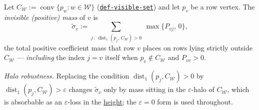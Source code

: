 \hypertarget{def:invisible-mass}{}%
\begin{definition}\label{def:invisible-mass}
Let $C_{\mathcal W}:=\operatorname{conv}\{p_w:w\in\mathcal W\}$ (\hyperref[def:visible-set]{\texttt{def-\allowbreak{}visible-\allowbreak{}set}}) and let
$p_v$ be a row vertex. The \emph{invisible (positive) mass} of $v$ is
\[\widetilde\sigma_v:=\sum_{j\,:\,\operatorname{dist}_1(p_j,\,C_{\mathcal W})>0}\ \max\{P_{vj},\,0\},\]
the total positive coefficient mass that row $v$ places on rows lying strictly outside $C_{\mathcal W}$ ---
\emph{including} the index $j=v$ itself when $p_v\notin C_{\mathcal W}$ and $P_{vv}>0$.

\emph{Halo robustness.} Replacing the condition $\operatorname{dist}_1(p_j,C_{\mathcal W})>0$ by
$\operatorname{dist}_1(p_j,C_{\mathcal W})>\varepsilon$ changes $\widetilde\sigma_v$ only by mass sitting
in the $\varepsilon$-halo of $C_{\mathcal W}$, which is absorbable as an $\varepsilon$-loss in the
\hyperref[def:height]{height}; the $\varepsilon=0$ form is used throughout.
\end{definition}
